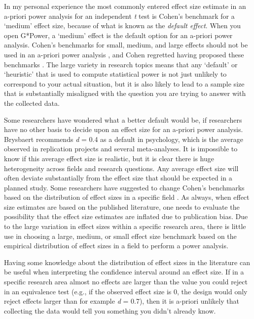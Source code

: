 \documentclass[
  oneside]{book}
\begin{document}
In my personal experience the most commonly entered effect size estimate in an a-priori power analysis for an independent \emph{t} test is Cohen's benchmark for a `medium' effect size, because of what is known as the \emph{default effect}. When you open G*Power, a `medium' effect is the default option for an a-priori power analysis. Cohen's benchmarks for small, medium, and large effects should not be used in an a-priori power analysis \citep{cook_assessing_2014, correll_avoid_2020}, and Cohen regretted having proposed these benchmarks \citep{funder_evaluating_2019}. The large variety in research topics means that any `default' or `heuristic' that is used to compute statistical power is not just unlikely to correspond to your actual situation, but it is also likely to lead to a sample size that is substantially misaligned with the question you are trying to answer with the collected data.

Some researchers have wondered what a better default would be, if researchers have no other basis to decide upon an effect size for an a-priori power analysis. Brysbaert \citeyearpar{brysbaert_how_2019-1} recommends \emph{d} = 0.4 as a default in psychology, which is the average observed in replication projects and several meta-analyses. It is impossible to know if this average effect size is realistic, but it is clear there is huge heterogeneity across fields and research questions. Any average effect size will often deviate substantially from the effect size that should be expected in a planned study. Some researchers have suggested to change Cohen's benchmarks based on the distribution of effect sizes in a specific field \citep{bosco_correlational_2015, hill_empirical_2008, kraft_interpreting_2020, lovakov_empirically_2017, funder_evaluating_2019}. As always, when effect size estimates are based on the published literature, one needs to evaluate the possibility that the effect size estimates are inflated due to publication bias. Due to the large variation in effect sizes within a specific research area, there is little use in choosing a large, medium, or small effect size benchmark based on the empirical distribution of effect sizes in a field to perform a power analysis.

Having some knowledge about the distribution of effect sizes in the literature can be useful when interpreting the confidence interval around an effect size. If in a specific research area almost no effects are larger than the value you could reject in an equivalence test (e.g., if the observed effect size is 0, the design would only reject effects larger than for example \emph{d} = 0.7), then it is a-priori unlikely that collecting the data would tell you something you didn't already know.
\end{document}
